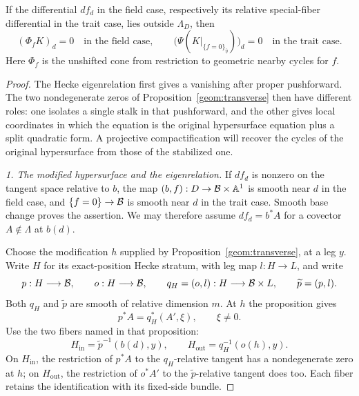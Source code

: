 \begin{lemma}\label{det:cut}
If the differential $df_d$ in the field case, respectively its relative
special-fiber differential in the trait case, lies outside $\Lambda_D$,
then
\[
      (\Phi_f K)_d=0
      \quad\text{in the field case},\qquad
      \bigl(\Psi(K|_{\{f=0\}_{\bar\eta}})\bigr)_d=0
      \quad\text{in the trait case}.
\]
Here $\Phi_f$ is the unshifted cone from restriction to geometric nearby
cycles for $f$.
\end{lemma}

\begin{proof}
The Hecke eigenrelation first gives a vanishing after proper pushforward.
The two nondegenerate zeros of Proposition~\ref{geom:transverse}
then have different roles: one isolates a single stalk in that pushforward,
and the other gives local coordinates in which the equation is the original
hypersurface equation plus a split quadratic form.  A projective compactification
will recover the cycles of the original hypersurface from those of the
stabilized one.

\smallskip\noindent
\emph{1. The modified hypersurface and the eigenrelation.}
If $df_d$ is nonzero on the tangent space relative to $b$, the map
$(b,f):D\to\mathcal B\times\mathbb A^1$ is smooth near $d$ in the field case,
and $\{f=0\}\to\mathcal B$ is smooth near $d$ in the trait case.  Smooth base
change proves the assertion.  We may therefore assume
$df_d=b^*A$ for a covector $A\notin\Lambda$ at $b(d)$.

Choose the modification $h$ supplied by
Proposition~\ref{geom:transverse}, at a leg $y$.  Write $H$ for its
exact-position Hecke stratum, with leg map $l:H\to L$, and write
\[
 p:H\longrightarrow\mathcal B,\qquad
 o:H\longrightarrow\mathcal B,\qquad
 q_H=(o,l):H\longrightarrow\mathcal B\times L,
 \qquad \widetilde p=(p,l).
\]
Both $q_H$ and $\widetilde p$ are smooth of relative dimension $m$.  At $h$
the proposition gives
\begin{equation}\label{det:eq-leg}
                 p^*A=q_H^*(A',\xi),\qquad \xi\ne0.
\end{equation}
Use the two fibers named in that proposition:
\[
 H_{\mathrm{in}}=\widetilde p^{-1}(b(d),y),\qquad
 H_{\mathrm{out}}=q_H^{-1}(o(h),y).
\]
On $H_{\mathrm{in}}$, the restriction of $p^*A$ to the $q_H$-relative
tangent has a nondegenerate zero at $h$; on $H_{\mathrm{out}}$, the
restriction of $o^*A'$ to the $\widetilde p$-relative tangent does too.
Each fiber retains the identification with its fixed-side bundle.


\end{proof}
